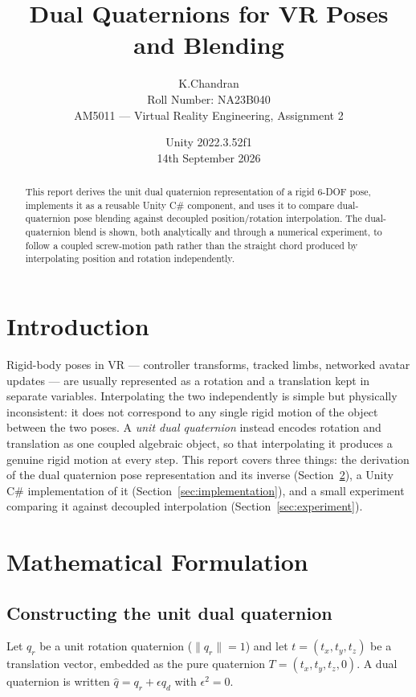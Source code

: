 \documentclass[11pt]{article}
\title{Dual Quaternions for VR Poses and Blending}
\author{K.Chandran\\
Roll Number: NA23B040\\
AM5011 --- Virtual Reality Engineering, Assignment 2}
\date{Unity 2022.3.52f1 \\ 14th September 2026}
\begin{document}
\maketitle

\begin{abstract}
This report derives the unit dual quaternion representation of a rigid 6-DOF
pose, implements it as a reusable Unity C\# component, and uses it to compare
dual-quaternion pose blending against decoupled position/rotation
interpolation. The dual-quaternion blend is shown, both analytically and
through a numerical experiment, to follow a coupled screw-motion path rather
than the straight chord produced by interpolating position and rotation
independently.
\end{abstract}

\section{Introduction}

Rigid-body poses in VR --- controller transforms, tracked limbs, networked
avatar updates --- are usually represented as a rotation and a translation
kept in separate variables. Interpolating the two independently is simple but
physically inconsistent: it does not correspond to any single rigid motion of
the object between the two poses. A \emph{unit dual quaternion} instead
encodes rotation and translation as one coupled algebraic object, so that
interpolating it produces a genuine rigid motion at every step. This report
covers three things: the derivation of the dual quaternion pose
representation and its inverse (Section~\ref{sec:math}), a Unity C\#
implementation of it (Section~\ref{sec:implementation}), and a small
experiment comparing it against decoupled interpolation
(Section~\ref{sec:experiment}).

\section{Mathematical Formulation}
\label{sec:math}

\subsection{Constructing the unit dual quaternion}

Let $q_r$ be a unit rotation quaternion ($\lVert q_r \rVert = 1$) and let
$t = (t_x, t_y, t_z)$ be a translation vector, embedded as the pure quaternion
$T = (t_x, t_y, t_z, 0)$. A dual quaternion is written $\hat q = q_r + \epsilon
q_d$ with $\epsilon^2 = 0$.
\end{document}
